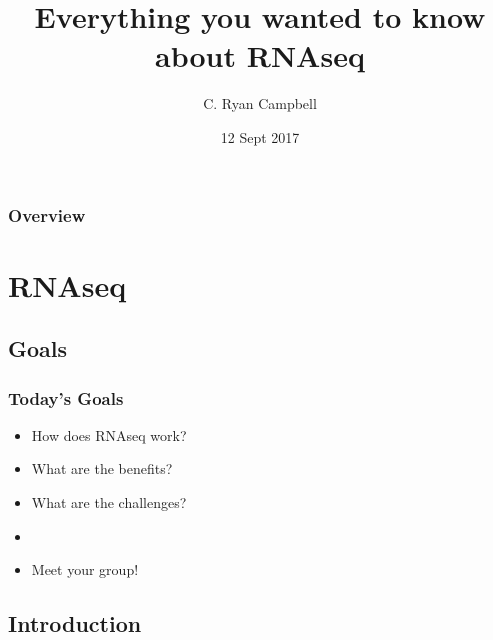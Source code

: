 \documentclass[14pt]{beamer}
\title[RNAseq]{Everything you wanted to know about RNAseq} %
\author{C. Ryan Campbell} %
\institute[Duke] %
{
Duke University \\ %
\medskip
\textit{c.ryan.campbell@duke.edu} %
}
\date{12 Sept 2017} %
\begin{document}
\begin{frame}
\titlepage %
\end{frame}

\begin{frame}
\frametitle{Overview} %
\tableofcontents %
\end{frame}


\section{RNAseq} 

\subsection{Goals} 

\begin{frame}
\frametitle{Today's Goals}
\begin{itemize}
	\item How does RNAseq work?
	\item What are the benefits?
	\item What are the challenges?
	\item[]
	\item Meet your group!
\end{itemize}
\end{frame}


\subsection{Introduction}
\end{document}

